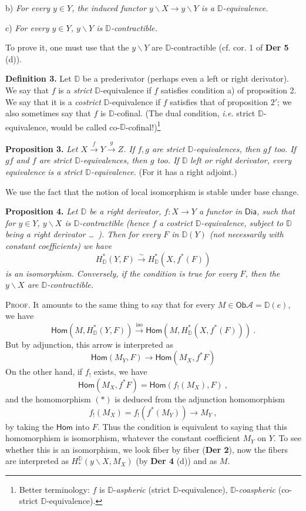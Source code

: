 \documentclass[11pt,leqno]{article}
\newcommand{\printedpage}[1]{\marginpar{\footnotesize p.~#1}}
\newcommand{\msp}[1]{\marginpar{\footnotesize [#1]}}
\newcommand{\DD}{\mathbb{D}}
\newcommand{\cA}{\mathcal{A}}
\newcommand{\Dia}{\mathsf{Dia}}
\newcommand{\Ob}{\mathsf{Ob}}
\newcommand{\isolongto}{\overset{\sim}{\longrightarrow}}
\newcommand{\sHom}{\mathsf{Hom}}
\begin{document}
b) \textit{For every $y \in Y$, the induced functor $y\backslash X \to y\backslash Y$ is a $\DD$-equivalence.}

c) \textit{For every $y \in Y$, $y\backslash Y$ is $\DD$-contractible.}

\noindent To prove it, one must use that the $y\backslash Y$ are $\DD$-contractible (cf. cor. 1 of \textbf{Der 5} (d)).

\clearpage
\printedpage{38}
\noindent\msp{page 65}

\noindent\textbf{Definition 3.} Let $\DD$ be a prederivator (perhaps even a left or right derivator). We say that $f$ is a \textit{strict} $\DD$-equivalence if $f$ satisfies condition a) of proposition 2. We say that it is a \textit{costrict} $\DD$-equivalence if $f$ satisfies that of proposition $2'$; we also sometimes say that $f$ is $\DD$-cofinal. (The dual condition, \textit{i.e.} strict $\DD$-equivalence, would be called co-$\DD$-cofinal!)\footnote[27]{Better terminology: $f$ is $\DD$-\textit{aspheric} (strict $\DD$-equivalence), $\DD$-\textit{coaspheric} (co-strict $\DD$-equivalence).} %

\noindent\textbf{Proposition 3.} \textit{Let $X \overset{f}{\to} Y \overset{g}{\to} Z$. If $f, g$ are strict $\DD$-equivalences, then $gf$ too. If $gf$ and $f$ are strict $\DD$-equivalences, then $g$ too. If $\DD$} \textit{left or right derivator, every equivalence} \textit{is a strict $\DD$-equivalence.} (For it has a right adjoint.)

We use the fact that the notion of local isomorphism is stable under base change.

\noindent\msp{page 66}

\noindent\textbf{Proposition 4.} \textit{Let $\DD$ be a right derivator, $f : X \to Y$ a functor in} $\Dia$\textit{, such that for $y \in Y$, $y\backslash X$ is $\DD$-contractible (hence $f$ a costrict $\DD$-equivalence, subject to $\DD$ being a right derivator \ldots\ ). Then for every $F$ in $\DD(Y)$ (not necessarily with constant coefficients) we have} %
\[
H^*_{\DD}(Y, F) \isolongto H^*_{\DD}(X, f^*(F))
\]
\textit{is an isomorphism. Conversely, if the condition is true for every $F$, then the $y\backslash X$ are $\DD$-contractible.}

\noindent\textsc{Proof}. It amounts to the same thing to say that for every $M \in \Ob \cA = \DD(e)$, we have
\[
\sHom(M, H^*_{\DD}(Y, F)) \overset{\mathrm{iso}}{\longrightarrow} \sHom(M, H^*_{\DD}(X, f^*(F))) \ .
\]
But by adjunction, this arrow is interpreted as
\[
\sHom(M_Y, F) \longrightarrow \sHom(M_X, f^*F) \tag*{$(*)$}
\]
On the other hand, if $f_!$ exists, we have
\[
\sHom(M_X, f^*F) = \sHom(f_!(M_X), F) \ ,
\]
and the homomorphism $(*)$ is deduced from the adjunction homomorphism
\[
f_!(M_X) = f_!(f^*(M_Y)) \longrightarrow M_Y \ , \tag*{$(**)$}
\]
by taking the $\sHom$ into $F$. Thus the condition is equivalent to saying that this homomorphism is isomorphism, whatever the constant coefficient $M_Y$ on $Y$. To see whether this is an isomorphism, we look fiber by fiber (\textbf{Der 2}), now the fibers are interpreted as $H^{\DD}_*(y\backslash X, M_X)$ (by \textbf{Der 4} (d)) and as $M$.
\end{document}
